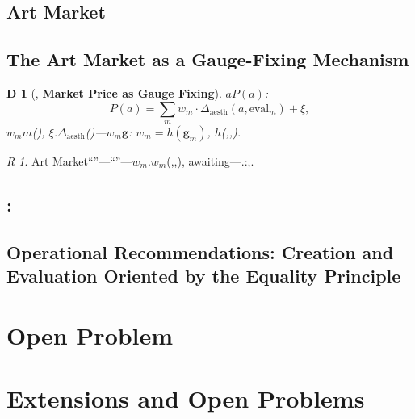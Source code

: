 \documentclass[12pt,a4paper]{article}
\newtheorem{definition}[theorem]Definition
\theoremstyle{remark}
\newtheorem{remark}[theorem]Remark
\newcommand{\AudCoord}{\mathcal{C}_{\text{aud}}}
\newcommand{\AesthDelta}{\Delta_{\text{aesth}}}
\newcommand{\GParam}{\mathbf{g}}
\begin{document}
\subsection{Art Market}
\subsection{The Art Market as a Gauge-Fixing Mechanism}
\begin{definition}[, \textbf{Market Price as Gauge Fixing}]\label{def:market_gauge}
$a$$P(a)$: 
\begin{equation}\label{eq:market_gauge_fix}
 P(a) = \sum_{m} w_m \cdot \AesthDelta(a, \text{eval}_m) + \xi,
\end{equation}
$w_m$$m$(), $\xi$.$\AesthDelta$()---$w_m$$\GParam$: $w_m = h(\GParam_m)$, $h$(,,).
\end{definition}
\begin{remark}
Art Market``''---``''---$w_m$.$w_m$(,,), awaiting---.:,.
\end{remark}
\subsection{:}
\subsection{Operational Recommendations: Creation and Evaluation Oriented by the Equality Principle}
\begin{enumerate}[label=\textbf{ \arabic*.}, leftmargin=*]
 \item \textbf{:}
 ``?''---.: ``$\AesthDelta$?$\AesthDelta$?''---.{\kaishu}(Les Demoiselles d'Avignon, 1907)$\AesthDelta$---..
 \item \textbf{:}
, $\AudCoord$---(), (``''), $\GParam$().---.
 \item \textbf{(,}$.}
 ``Artistic Value''---$\GParam$.,,.,.
 \item \textbf{:}
 ``'', : ``, $\AesthDelta$.''---,.
\end{enumerate}
\section{Open Problem}
\section{Extensions and Open Problems}
\end{document}
